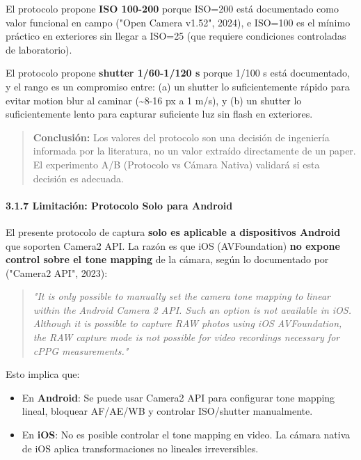 El protocolo propone \textbf{ISO 100-200} porque ISO=200 está documentado como valor funcional en campo ("Open Camera v1.52", 2024), e ISO=100 es el mínimo práctico en exteriores sin llegar a ISO=25 (que requiere condiciones controladas de laboratorio).


El protocolo propone \textbf{shutter 1/60-1/120 s} porque 1/100 s está documentado, y el rango es un compromiso entre: (a) un shutter lo suficientemente rápido para evitar motion blur al caminar (\textasciitilde{}8-16 px a 1 m/s), y (b) un shutter lo suficientemente lento para capturar suficiente luz sin flash en exteriores.


\begin{quote}
\textbf{Conclusión:} Los valores del protocolo son una decisión de ingeniería informada por la literatura, no un valor extraído directamente de un paper. El experimento A/B (Protocolo vs Cámara Nativa) validará si esta decisión es adecuada.
\end{quote}


\paragraph{3.1.7 Limitación: Protocolo Solo para Android}


El presente protocolo de captura \textbf{solo es aplicable a dispositivos Android} que soporten Camera2 API. La razón es que iOS (AVFoundation) \textbf{no expone control sobre el tone mapping} de la cámara, según lo documentado por ("Camera2 API", 2023):


\begin{quote}
\textit{"It is only possible to manually set the camera tone mapping to linear within the Android Camera 2 API. Such an option is not available in iOS. Although it is possible to capture RAW photos using iOS AVFoundation, the RAW capture mode is not possible for video recordings necessary for cPPG measurements."}
\end{quote}


Esto implica que:

\begin{itemize}
\item En \textbf{Android}: Se puede usar Camera2 API para configurar tone mapping lineal, bloquear AF/AE/WB y controlar ISO/shutter manualmente.
\item En \textbf{iOS}: No es posible controlar el tone mapping en video. La cámara nativa de iOS aplica transformaciones no lineales irreversibles.
\end{itemize}

